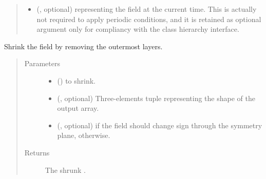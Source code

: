 \documentclass[letterpaper,10pt,english]{sphinxmanual}
\begin{document}
\begin{fulllineitems}
\begin{fulllineitems}
\begin{quote}
\begin{description}
\begin{itemize}
\item {} 
 (, optional) \textendash{}  representing the field at the current time.
This is actually not required to apply periodic conditions, and it is retained as optional
argument only for compliancy with the class hierarchy interface.

\end{itemize}

\end{description}\end{quote}

\end{fulllineitems}


\begin{fulllineitems}
\label{\detokenize{api:dycore.horizontal_boundary.Periodic.from_computational_to_physical_domain}}
Shrink the field  by removing the  outermost layers.
\begin{quote}\begin{description}
\item[{Parameters}] \leavevmode\begin{itemize}
\item {} 
 () \textendash{}  to shrink.

\item {} 
 (, optional) \textendash{} Three-elements tuple representing the shape of the output array.

\item {} 
 (, optional) \textendash{}  if the field should change sign through the symmetry plane,
 otherwise.

\end{itemize}

\item[{Returns}] \leavevmode
The shrunk .


\end{description}
\end{quote}
\end{fulllineitems}
\end{fulllineitems}
\end{document}
